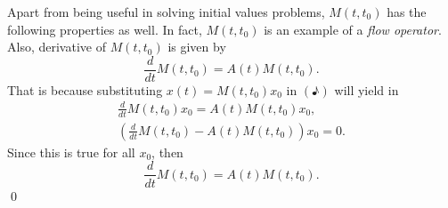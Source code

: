 Apart from being useful in solving initial values problems, $M(t,t_0)$ has the following properties as well. In fact, $M(t,t_0)$ is an example of a \textit{flow operator}. Also, derivative of $M(t,t_0)$ is given by
\[ \dfrac{d}{dt} M(t,t_0) = A(t) M(t,t_0). \]
That is because substituting $x(t) = M(t,t_0) x_0$ in $(\eighthnote)$ will yield in 
\begin{align*}
	\frac{d}{dt} M(t,t_0) x_0 = A(t) M(t,t_0) x_0, \\
	(\frac{d}{dt} M(t,t_0) - A(t) M(t,t_0))x_0 = 0.
\end{align*}
Since this is true for all $x_0$, then 
\[ \frac{d}{dt} M(t,t_0) = A(t) M(t,t_0). \] \qed